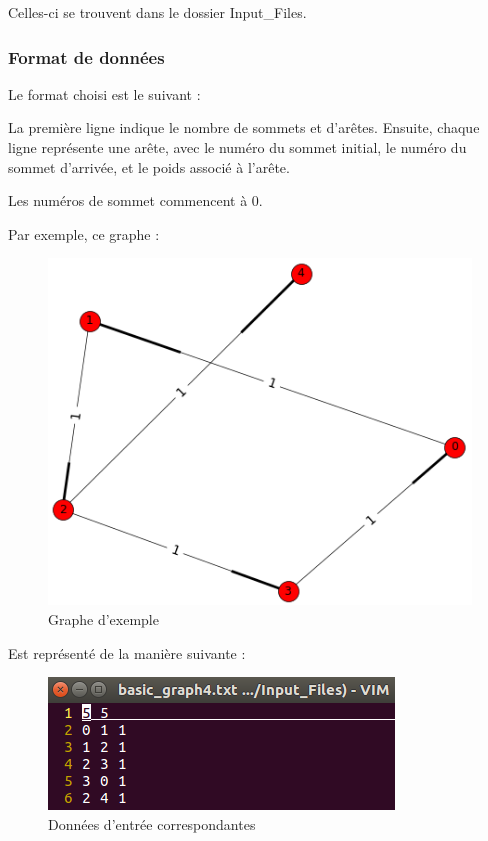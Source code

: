\documentclass[a4paper,11pt]{article}
\begin{document}
Celles-ci se trouvent dans le dossier Input\_Files.

\subsubsection{Format de données}

Le format choisi est le suivant :

La première ligne indique le nombre de sommets et d'arêtes.
Ensuite, chaque ligne représente une arête, avec le numéro du sommet initial, le numéro du sommet d'arrivée, et le poids associé à l'arête.

Les numéros de sommet commencent à 0.

\noindent Par exemple, ce graphe :

\begin{figure}[h]
\begin{center}
  \includegraphics[scale=0.7]{input_exemple.png}
  \caption{Graphe d'exemple}
\end{center}
\end{figure}

\noindent Est représenté de la manière suivante :

\begin{figure}[h]
\begin{center}
  \includegraphics[scale=0.7]{input_graph4.png}
  \caption{Données d'entrée correspondantes}
\end{center}
\end{figure}
\end{document}

